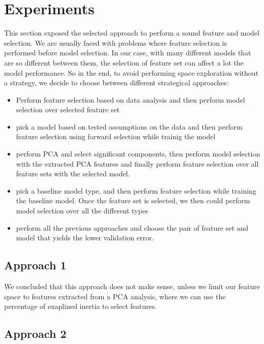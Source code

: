 \section{Experiments}

This section exposed the selected approach to perform a sound feature and model selection. We are usually faced with problems where feature selection is performed before model selection. In our case, with many different models that are so different between them, the selection of feature set can affect a lot the model performance. So in the end, to avoid performing space exploration without a strategy, we decide to choose between different strategical approaches:
\begin{itemize}
    \item Perform feature selection based on data analysis and then perform model selection over selected feature set
    \item pick a model based on tested assumptions on the data and then perform feature selection using forward selection while trainig the model
    \item perform PCA and select significant components, then perform model selection with the extracted PCA features and finally perform feature selection over all feature sets with the selected model.
    \item pick a baseline model type, and then perform feature selection while training the baseline model. Once the feature set is selected, we then could perform model selection over all the different types
    \item perform all the previous approaches and choose the pair of feature set and model that yields the lower validation error.
\end{itemize}

\subsection{Approach 1}

We concluded that this approach does not make sense, unless we limit our feature space to features extracted from a PCA analysis, where we can use the percentage of exaplined inertia to select features.




\subsection{Approach 2}

